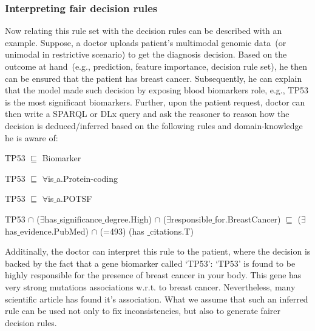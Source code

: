 \subsubsection{Interpreting fair decision rules}

Now relating this rule set with the decision rules can be described with an example. Suppose, a doctor uploads patient's multimodal genomic data~(or unimodal in restrictive scenario) to get the diagnosis decision. Based on the outcome at hand~(e.g., prediction, feature importance, decision rule set), he then can be ensured that the patient has breast cancer. Subsequently, he can explain that the model made such decision by exposing blood biomarkers role, e.g., TP53 is the most significant biomarkers. Further, upon the patient request, doctor can then write a SPARQL or DLx query and ask the reasoner to reason how the decision is deduced/inferred based on the following rules and domain-knowledge he is aware of:  

\begin{itemize}[noitemsep]
\scriptsize{
    \item TP53 $ \sqsubseteq  $ Biomarker
    \item TP53 $ \sqsubseteq  $ $  \forall $is$ {\_}$a.Protein-coding
    \item TP53 $ \sqsubseteq  $ $  \forall $is$ {\_}$a.POTSF
    \item TP53 $  \cap $ ($\exists$has$ {\_}$significance$ {\_}$degree.High) $  \cap $ ($\exists$responsible$ {\_}$for.BreastCancer) $ \sqsubseteq  $ ($\exists$has$ {\_}$evidence.PubMed) $\cap$ (=493) (has ${\_}$citations.T)}
\end{itemize}

\hspace*{3.5mm} Additinally, the doctor can interpret this rule to the patient, where the decision is backed by the fact that a gene biomarker called `TP53': `TP53' is found to be highly responsible for the presence of breast cancer in your body. This gene has very strong mutations associations w.r.t. to breast cancer. Nevertheless, many scientific article has found it's association. What we assume that such an inferred rule can be used not only to fix inconsistencies, but also to generate fairer decision rules.


